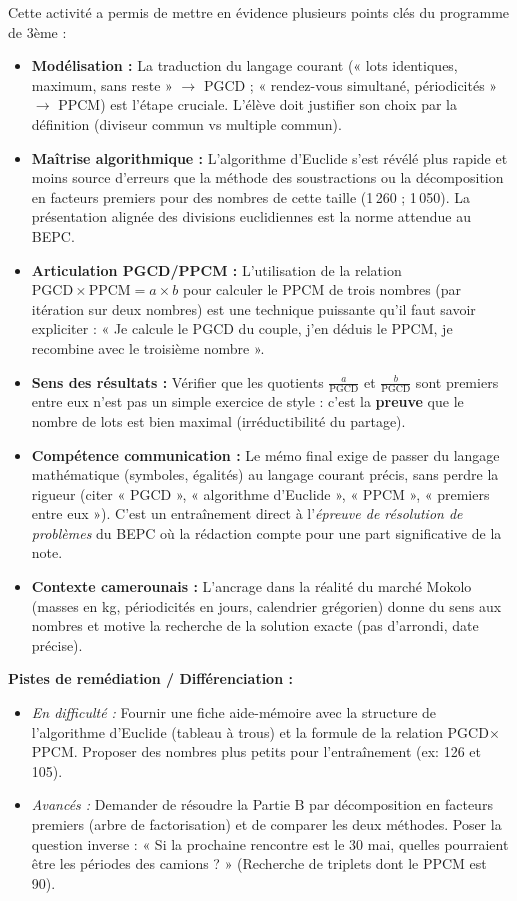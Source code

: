 \documentclass[11pt]{article}
\newcounter{popsec}
\newcounter{popsub}
\newcommand{\courssub}[1]{%
  \stepcounter{popsub}%
  \par\vspace{9pt}\noindent{\popxbold\fontsize{11.5}{13}\selectfont\color{popink}{\color{poporange}\thepopsec.\thepopsub}\hspace{6pt}#1}\par\nopagebreak\vspace{4pt}
}
\begin{document}
\courssub{Bilan de l'activité}
Cette activité a permis de mettre en évidence plusieurs points clés du programme de 3ème :
\begin{itemize}
    \item \textbf{Modélisation :} La traduction du langage courant (« lots identiques, maximum, sans reste » $\to$ PGCD ; « rendez-vous simultané, périodicités » $\to$ PPCM) est l'étape cruciale. L'élève doit justifier son choix par la définition (diviseur commun vs multiple commun).
    \item \textbf{Maîtrise algorithmique :} L'algorithme d'Euclide s'est révélé plus rapide et moins source d'erreurs que la méthode des soustractions ou la décomposition en facteurs premiers pour des nombres de cette taille (1\,260 ; 1\,050). La présentation alignée des divisions euclidiennes est la norme attendue au BEPC.
    \item \textbf{Articulation PGCD/PPCM :} L'utilisation de la relation $\text{PGCD} \times \text{PPCM} = a \times b$ pour calculer le PPCM de trois nombres (par itération sur deux nombres) est une technique puissante qu'il faut savoir expliciter : « Je calcule le PGCD du couple, j'en déduis le PPCM, je recombine avec le troisième nombre ».
    \item \textbf{Sens des résultats :} Vérifier que les quotients $\frac{a}{\text{PGCD}}$ et $\frac{b}{\text{PGCD}}$ sont premiers entre eux n'est pas un simple exercice de style : c'est la \textbf{preuve} que le nombre de lots est bien maximal (irréductibilité du partage).
    \item \textbf{Compétence communication :} Le mémo final exige de passer du langage mathématique (symboles, égalités) au langage courant précis, sans perdre la rigueur (citer « PGCD », « algorithme d'Euclide », « PPCM », « premiers entre eux »). C'est un entraînement direct à l'\emph{épreuve de résolution de problèmes} du BEPC où la rédaction compte pour une part significative de la note.
    \item \textbf{Contexte camerounais :} L'ancrage dans la réalité du marché Mokolo (masses en kg, périodicités en jours, calendrier grégorien) donne du sens aux nombres et motive la recherche de la solution exacte (pas d'arrondi, date précise).
\end{itemize}
\medskip
\noindent \textbf{Pistes de remédiation / Différenciation :}
\begin{itemize}
    \item \emph{En difficulté :} Fournir une fiche aide-mémoire avec la structure de l'algorithme d'Euclide (tableau à trous) et la formule de la relation PGCD$\times$PPCM. Proposer des nombres plus petits pour l'entraînement (ex: 126 et 105).
    \item \emph{Avancés :} Demander de résoudre la Partie B par décomposition en facteurs premiers (arbre de factorisation) et de comparer les deux méthodes. Poser la question inverse : « Si la prochaine rencontre est le 30 mai, quelles pourraient être les périodes des camions ? » (Recherche de triplets dont le PPCM est 90).
\end{itemize}
\end{document}
